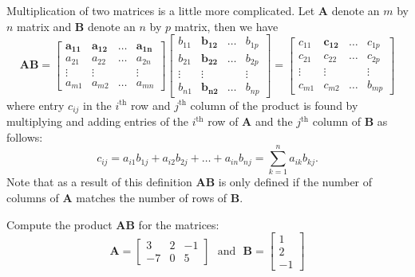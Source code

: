 Multiplication of two matrices is a little more complicated. Let $\mathbf{A}$ denote an $m$ by $n$ matrix and $\mathbf{B}$ denote an $n$ by $p$ matrix, then we have
\[ \mathbf{AB} = \left[ \begin{array}{cccc} \mathbf{a_{11}} & \mathbf{a_{12}} & \ldots & \mathbf{a_{1n}} \\
a_{21} & a_{22} & \ldots & a_{2n} \\
\vdots & \vdots & & \vdots \\
a_{m1} & a_{m2} & \mathbf{\ldots} & a_{mn} \end{array} \right]
\left[ \begin{array}{cccc} 
b_{11} & \mathbf{b_{12}} & \ldots & b_{1p} \\
b_{21} & \mathbf{b_{22}} & \ldots & b_{2p} \\
\vdots & \mathbf{ \vdots } & & \vdots \\
b_{n1} & \mathbf{b_{n2}} & \ldots & b_{np} \end{array} \right] =
\left[ \begin{array}{cccc} 
c_{11} & \mathbf{c_{12}} & \ldots & c_{1p} \\
c_{21} & c_{22} & \ldots & c_{2p} \\
\vdots & \vdots & & \vdots \\
c_{m1} & c_{m2} & \ldots & b_{mp} \end{array} \right] \]
where entry $c_{ij}$ in the $i^{\mbox{th}}$ row and $j^{\mbox{th}}$ column of the product is found by
multiplying and adding entries of the $i^{\mbox{th}}$ row of $\mathbf{A}$ and the $j^{\mbox{th}}$ column
of $\mathbf{B}$ as follows:
\[ c_{ij} = a_{i1}b_{1j} + a_{i2}b_{2j} + \ldots + a_{in}b_{nj} = \sum_{k = 1}^n a_{ik}b_{kj}.\]
Note that as a result of this definition $\mathbf{AB}$ is only defined if the number of columns of $\mathbf{A}$ matches
the number of rows of $\mathbf{B}$.

\clearpage

\bb[resume]
\ii Compute the product $\mathbf{AB}$ for the matrices:\label{13problem8}
\bb
\ii \[ \mathbf{A} =  \left[ \begin{array}{ccc} 3 & 2 & -1  \\ -7 & 0 & 5 \end{array} \right] \ \ \ \mbox{and} \ \ \
 \mathbf{B} = \left[ \begin{array}{c} 1 \\ 2 \\ -1  \end{array} \right] \]
\vfill

